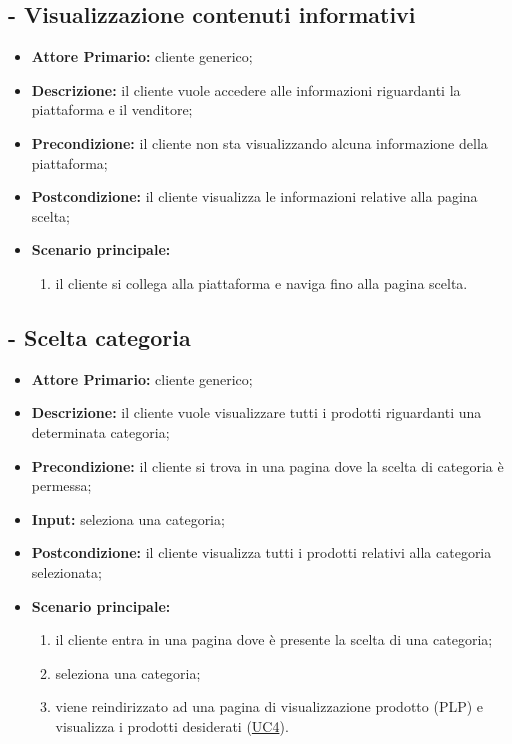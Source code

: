 \resetCUC

\stepUserCase
\subsection{ - Visualizzazione contenuti informativi}
\begin{itemize}
    \item \textbf{Attore Primario:} cliente generico;
    \item \textbf{Descrizione:} il cliente vuole accedere alle informazioni riguardanti la piattaforma e il venditore;
    \item \textbf{Precondizione:} il cliente non sta visualizzando alcuna informazione della piattaforma;
    \item \textbf{Postcondizione:} il cliente visualizza le informazioni relative alla pagina scelta;
    \item \textbf{Scenario principale:}
          \begin{enumerate}
              \item il cliente si collega alla piattaforma e naviga fino alla pagina scelta.
          \end{enumerate}
\end{itemize}

\stepUserCase
\subsection{ - Scelta categoria}
\begin{itemize}
    \item \textbf{Attore Primario:} cliente generico;
    \item \textbf{Descrizione:} il cliente vuole visualizzare tutti i prodotti riguardanti una determinata categoria;
    \item \textbf{Precondizione:} il cliente si trova in una pagina dove la scelta di categoria è permessa;
    \item \textbf{Input:} seleziona una categoria;
    \item \textbf{Postcondizione:} il cliente visualizza tutti i prodotti relativi alla categoria selezionata;
    \item \textbf{Scenario principale:}
          \begin{enumerate}
              \item il cliente entra in una pagina dove è presente la scelta di una categoria;
              \item seleziona una categoria;
              \item viene reindirizzato ad una pagina di visualizzazione prodotto (PLP) e visualizza i prodotti desiderati (\hyperref[UC4]{UC4}).
          \end{enumerate}
\end{itemize}

